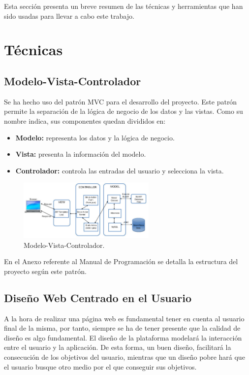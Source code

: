 
Esta sección presenta un breve resumen de las técnicas y herramientas que han sido usadas para llevar a cabo este trabajo.

\section{Técnicas}

\subsection{Modelo-Vista-Controlador}
Se ha hecho uso del patrón MVC para el desarrollo del proyecto. Este patrón permite la separación de la lógica de negocio de los datos y las vistas. Como su nombre indica, sus componentes quedan divididos en:

\begin{itemize}
	\item \textbf{Modelo:} representa los datos y la lógica de negocio.
	\item \textbf{Vista:} presenta la información del modelo.
	\item \textbf{Controlador:} controla las entradas del usuario y selecciona la vista.
\end{itemize}

\begin{figure}[h]
  \centering
    \includegraphics[width=0.6\textwidth]{../img/diagramas/mvc.png}
  \caption{Modelo-Vista-Controlador.}
  \label{ciclo}
\end{figure}

En el Anexo referente al Manual de Programación se detalla la estructura del proyecto según este patrón.

\subsection{Diseño Web Centrado en el Usuario}

A la hora de realizar una página web es fundamental tener en cuenta al usuario final de la misma, por tanto, siempre se ha de tener presente que la calidad de diseño es algo fundamental. El diseño de la plataforma modelará la interacción entre el usuario y la aplicación. De esta forma, un buen diseño, facilitará la consecución de los objetivos del usuario, mientras que un diseño pobre hará que el usuario busque otro medio por el que conseguir sus objetivos.

